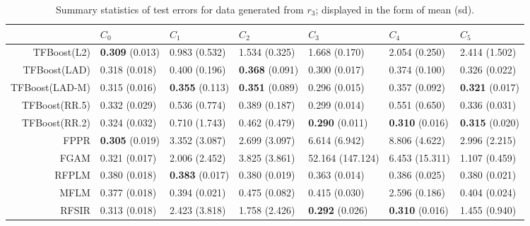 \begin{table}[H]
\centering
\footnotesize
\begin{tabular}{rllllll}
  \hline
 & $C_0$ & $C_1$ & $C_2$ & $C_3$ & $C_4$ & $C_5$ \\ 
  \hline
TFBoost(L2) & \textbf{0.309} (0.013) & 0.983 (0.532) & 1.534 (0.325) & 1.668 (0.170) & 2.054 (0.250) & 2.414 (1.502) \\ 
  TFBoost(LAD) & 0.318 (0.018) & 0.400 (0.196) & \textbf{0.368} (0.091) & 0.300 (0.017) & 0.374 (0.100) & 0.326 (0.022) \\ 
  TFBoost(LAD-M) & 0.315 (0.016) & \textbf{0.355} (0.113) & \textbf{0.351} (0.089) & 0.296 (0.015) & 0.357 (0.092) & \textbf{0.321} (0.017) \\ 
  TFBoost(RR.5) & 0.332 (0.029) & 0.536 (0.774) & 0.389 (0.187) & 0.299 (0.014) & 0.551 (0.650) & 0.336 (0.031) \\ 
  TFBoost(RR.2) & 0.324 (0.032) & 0.710 (1.743) & 0.462 (0.479) & \textbf{0.290} (0.011) & \textbf{0.310} (0.016) & \textbf{0.315} (0.020) \\ 
  FPPR & \textbf{0.305} (0.019) & 3.352 (3.087) & 2.699 (3.097) & 6.614 (6.942) & 8.806 (4.622) & 2.996 (2.215) \\ 
  FGAM & 0.321 (0.017) & 2.006 (2.452) & 3.825 (3.861) & 52.164 (147.124) & 6.453 (15.311) & 1.107 (0.459) \\ 
  RFPLM & 0.380 (0.018) & \textbf{0.383} (0.017) & 0.380 (0.019) & 0.363 (0.014) & 0.386 (0.025) & 0.380 (0.021) \\ 
  MFLM & 0.377 (0.018) & 0.394 (0.021) & 0.475 (0.082) & 0.415 (0.030) & 2.596 (0.186) & 0.404 (0.024) \\ 
  RFSIR & 0.313 (0.018) & 2.423 (3.818) & 1.758 (2.426) & \textbf{0.292} (0.026) & \textbf{0.310} (0.016) & 1.455 (0.940) \\ 
   \hline
\end{tabular}
\caption{Summary statistics of test errors for data generated from $r_3$; displayed in the form of mean (sd).} 
\end{table}

